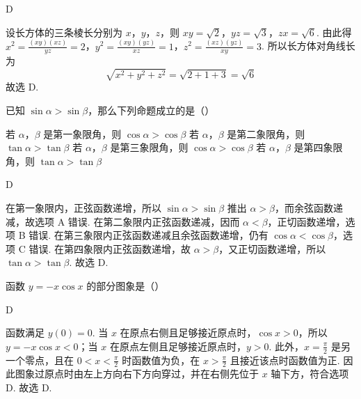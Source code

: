 \begin{answer}
D
\end{answer}

\begin{solution}
设长方体的三条棱长分别为 \(x\)，\(y\)，\(z\)，则
\(xy=\sqrt{2}\)，\(yz=\sqrt{3}\)，\(zx=\sqrt{6}\). 由此得
\(x^2=\frac{(xy)(xz)}{yz}=2\)，\(y^2=\frac{(xy)(yz)}{xz}=1\)，\(z^2=\frac{(xz)(yz)}{xy}=3\). 所以长方体对角线长为
\[
\sqrt{x^2+y^2+z^2}=\sqrt{2+1+3}=\sqrt{6}
\]
故选 D.
\end{solution}

\begin{problem}
已知 \(\sin\alpha>\sin\beta\)，那么下列命题成立的是（\quad）

\choices
    {若 \(\alpha\)，\(\beta\) 是第一象限角，则 \(\cos\alpha>\cos\beta\)}
    {若 \(\alpha\)，\(\beta\) 是第二象限角，则 \(\tan\alpha>\tan\beta\)}
    {若 \(\alpha\)，\(\beta\) 是第三象限角，则 \(\cos\alpha>\cos\beta\)}
    {若 \(\alpha\)，\(\beta\) 是第四象限角，则 \(\tan\alpha>\tan\beta\)}
\end{problem}

\begin{answer}
D
\end{answer}

\begin{solution}
在第一象限内，正弦函数递增，所以 \(\sin\alpha>\sin\beta\) 推出 \(\alpha>\beta\)，而余弦函数递减，故选项 A 错误. 在第二象限内正弦函数递减，因而 \(\alpha<\beta\)，正切函数递增，选项 B 错误. 在第三象限内正弦函数递减且余弦函数递增，仍有 \(\cos\alpha<\cos\beta\)，选项 C 错误. 在第四象限内正弦函数递增，故 \(\alpha>\beta\)，又正切函数递增，所以 \(\tan\alpha>\tan\beta\). 故选 D.
\end{solution}

\begin{problem}
函数 \(y=-x\cos x\) 的部分图象是（\quad）

    {}
    {}
    {}
\end{problem}

\begin{answer}
D
\end{answer}

\begin{solution}
函数满足 \(y(0)=0\). 当 \(x\) 在原点右侧且足够接近原点时，\(\cos x>0\)，所以 \(y=-x\cos x<0\)；当 \(x\) 在原点左侧且足够接近原点时，\(y>0\). 此外，\(x=\frac{\pi}{2}\) 是另一个零点，且在 \(0<x<\frac{\pi}{2}\) 时函数值为负，在 \(x>\frac{\pi}{2}\) 且接近该点时函数值为正. 因此图象过原点时由左上方向右下方向穿过，并在右侧先位于 \(x\) 轴下方，符合选项 D. 故选 D.
\end{solution}

